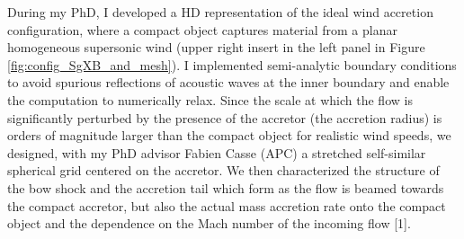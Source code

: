 \documentclass[11pt,onecolumn]{article}
\begin{document}
During my PhD, I developed a HD representation of the ideal wind accretion configuration, where a compact object captures material from a planar homogeneous supersonic wind (upper right insert in the left panel in Figure\,\ref{fig:config_SgXB_and_mesh}). I implemented semi-analytic boundary conditions to avoid spurious reflections of acoustic waves at the inner boundary and enable the computation to numerically relax. Since the scale at which the flow is significantly perturbed by the presence of the accretor (the accretion radius) is orders of magnitude larger than the compact object for realistic wind speeds, we designed, with my PhD advisor Fabien Casse (APC) a stretched self-similar spherical grid centered on the accretor. We then characterized the structure of the bow shock and the accretion tail which form as the flow is beamed towards the compact accretor, but also the actual mass accretion rate onto the compact object and the dependence on the Mach number of the incoming flow [1]. 
\end{document}

